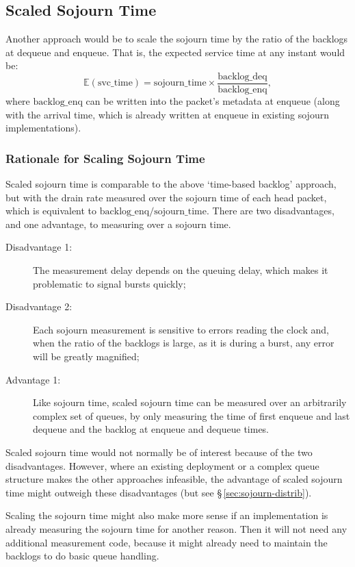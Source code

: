 \subsection{Scaled Sojourn Time}\label{sec:scaled_svc_time}

Another approach would be to scale the sojourn time by the ratio of the backlogs at dequeue and enqueue. That is, the expected service time at any instant would be:
\[\mathbb{E}(\mathrm{svc\_time}) = \mathrm{sojourn\_time} \times \frac{\mathrm{backlog\_deq}}{\mathrm{backlog\_enq}},\]
where \(\mathrm{backlog\_enq}\) can be written into the packet's metadata at enqueue (along with the arrival time, which is already written at enqueue in existing sojourn implementations).

\subsubsection{Rationale for Scaling Sojourn Time}\label{sec:inst_svc_time_justify}

Scaled sojourn time is comparable to the above `time-based backlog' approach, but with the drain rate measured over the sojourn time of each head packet, which is equivalent to \(\mathrm{backlog\_enq}/\mathrm{sojourn\_time}\). There are two disadvantages, and one advantage, to measuring over a sojourn time.
\begin{description}
	\item[Disadvantage 1:] The measurement delay depends on the queuing delay, which makes it problematic to signal bursts quickly;
	\item[Disadvantage 2:] Each sojourn measurement is sensitive to errors reading the clock and, when the ratio of the backlogs is large, as it is during a burst, any error will be greatly magnified;
	\item[Advantage 1:] Like sojourn time, scaled sojourn time can be measured over an arbitrarily complex set of queues, by only measuring the time of first enqueue and last dequeue and the backlog at enqueue and dequeue times.
\end{description}

Scaled sojourn time would not normally be of interest because of the two disadvantages. However, where an existing deployment or a complex queue structure makes the other approaches infeasible, the advantage of scaled sojourn time might outweigh these disadvantages (but see \S\,\ref{sec:sojourn-distrib}).

Scaling the sojourn time might also make more sense if an implementation is already measuring the sojourn time for another reason. Then it will not need any additional measurement code, because it might already need to maintain the backlogs to do basic queue handling.

